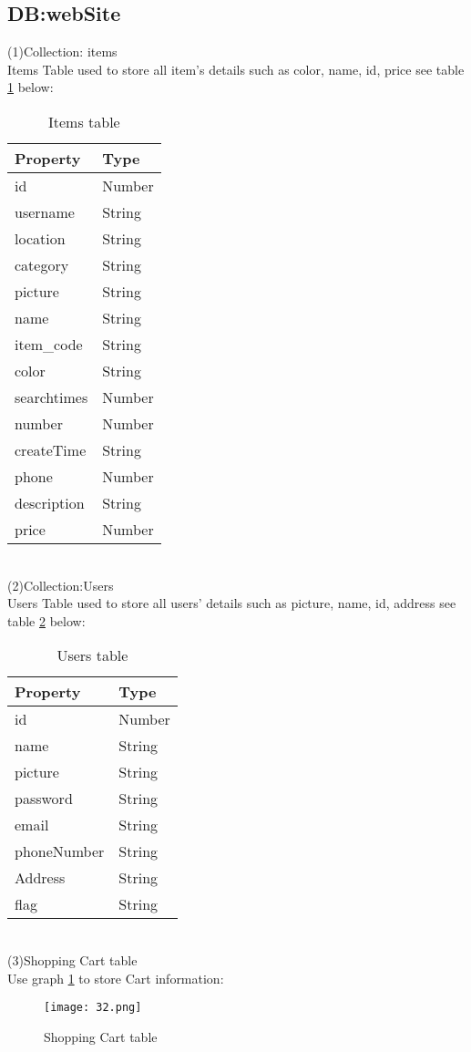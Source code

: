 \subsection{DB:webSite}
(1)Collection: items\\
Items Table used to store all item's details such as color, name, id, price see table \ref{tab:1} below:
\\
\begin{table}[h]
	\centering
	\begin{tabular}{l | l}
		Property & Type \\
		\hline
		id & Number \\
		username & String\\
		location & String\\
		category & String\\
		picture & String\\
		name & String\\
		item\_code & String\\
		color & String\\
		searchtimes & Number\\
		number & Number\\
		createTime & String\\
		phone & Number\\
		description & String\\
		price & Number
	\end{tabular}
	\caption{Items table}
	\label{tab:1}
\end{table}
\\
(2)Collection:Users\\
Users Table used to store all users' details such as picture, name, id, address see table \ref{tab:2} below:
\\
\begin{table}[h]
	\centering
	\begin{tabular}{l | l}
		Property & Type \\
		\hline
		id & Number \\
		name & String\\
		picture & String\\
		password & String\\
		email & String\\
		phoneNumber & String\\
		Address & String\\
		flag & String
	\end{tabular}
	\caption{Users table}
	\label{tab:2}
\end{table}
\\
(3)Shopping Cart table\\
Use graph \ref{fig:11 cubed graph} to store Cart information:\\
\begin{figure}[h]
	\centering
	\texttt{[image: 32.png]}
	\caption{Shopping Cart table}
	\label{fig:11 cubed graph}
\end{figure}
\\
